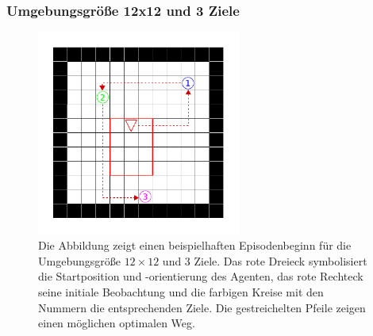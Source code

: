 \subsubsection{Umgebungsgröße 12x12 und 3 Ziele}

\begin{figure}[ht!]
  \centering
  \includegraphics[keepaspectratio,width=0.6\textwidth]{abbildungen/12x12_ep_start.pdf}
  \caption{Die Abbildung zeigt einen beispielhaften Episodenbeginn für die Umgebungsgröße $12 \times 12$ und 3 Ziele. Das rote Dreieck symbolisiert die Startposition und -orientierung des Agenten, das rote Rechteck seine initiale Beobachtung und die farbigen Kreise mit den Nummern die entsprechenden Ziele. Die gestreichelten Pfeile zeigen einen möglichen optimalen Weg.}
  \label{fig_12x12_ep_start}
\end{figure}

